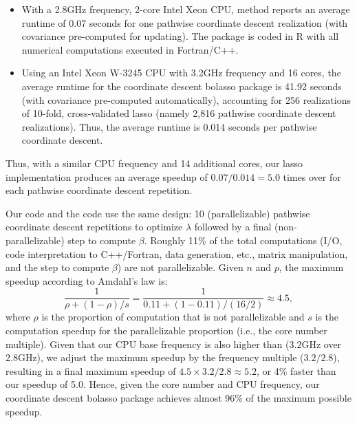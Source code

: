 \documentclass[11pt,review,authoryear]{elsarticle}
\begin{document}
\begin{itemize}
  \item With a 2.8GHz frequency, 2-core Intel Xeon CPU,
      \citet[Table 1]{friedman2010regularization} method reports an average runtime of 0.07 seconds for one pathwise coordinate descent realization (with covariance pre-computed for updating). The \citet{friedman2010regularization} package is coded in R with all numerical computations executed in Fortran/C++.
  \item Using an Intel Xeon W-3245 CPU with 3.2GHz frequency and 16 cores, the average runtime for the coordinate descent bolasso package is 41.92 seconds (with covariance pre-computed automatically), accounting for 256 realizations of 10-fold, cross-validated lasso (namely 2,816 pathwise coordinate descent realizations). Thus, the average runtime is 0.014 seconds per pathwise coordinate descent.
\end{itemize}

\noindent
Thus, with a similar CPU frequency and 14 additional cores, our lasso implementation produces an average speedup of $0.07/0.014=5.0$ times over \citet{friedman2010regularization} for each pathwise coordinate descent repetition.

Our code and the \citet{friedman2010regularization} code use the same design: 10 (parallelizable) pathwise coordinate descent repetitions to optimize $\lambda$ followed by a final (non-parallelizable) step to compute $\beta$. Roughly 11\% of the total computations (I/O, code interpretation to C++/Fortran, data generation, etc., matrix manipulation, and the step to compute $\beta$) are not parallelizable. Given $n$ and $p$, the maximum speedup according to Amdahl's law is:
%
\begin{equation}
  \frac{1}{\rho + (1-\rho)/s} = \frac{1}{0.11 + (1-0.11)/(16/2)} \approx 4.5,
\end{equation}
%
where $\rho$ is the proportion of computation that is not parallelizable and $s$ is the computation speedup for the parallelizable proportion (i.e., the core number multiple). Given that our CPU base frequency is also higher than \citet{friedman2010regularization} ($3.2$GHz over $2.8$GHz), we adjust the maximum speedup by the frequency multiple ($3.2/2.8$), resulting in a final maximum speedup of $4.5 \times 3.2/2.8 \approx 5.2$, or 4\% faster than our speedup of 5.0. Hence, given the core number and CPU frequency, our coordinate descent bolasso package achieves almost 96\% of the maximum possible speedup.
\end{document}
